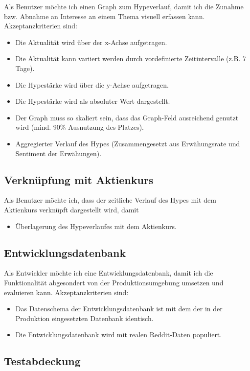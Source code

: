 \documentclass[a4paper, 10pt, conference]{ieeeconf}
\begin{document}
Als Benutzer möchte ich einen Graph zum Hypeverlauf, damit ich die Zunahme bzw. Abnahme an Interesse an einem Thema visuell erfassen kann. Akzeptanzkriterien sind:
\begin{itemize}
\item Die Aktualität wird über der x-Achse aufgetragen.
\item Die Aktualität kann variiert werden durch vordefinierte Zeitintervalle (z.B. 7 Tage).
\item Die Hypestärke wird über die y-Achse aufgetragen.
\item Die Hypestärke wird als absoluter Wert dargestellt.
\item Der Graph muss so skaliert sein, dass das Graph-Feld ausreichend genutzt wird (mind. 90\% Ausnutzung des Platzes).
\item Aggregierter Verlauf des Hypes (Zusammengesetzt aus Erwähungsrate und Sentiment der Erwähungen).
\end{itemize}

\subsection{Verknüpfung mit Aktienkurs}

Als Benutzer möchte ich, dass der zeitliche Verlauf des Hypes mit dem Aktienkurs verknüpft dargestellt wird, damit
\begin{itemize}
\item Überlagerung des Hypeverlaufes mit dem Aktienkurs.
\end{itemize}

\subsection{Entwicklungsdatenbank}

Als Entwickler möchte ich eine Entwicklungsdatenbank, damit ich die Funktionalität abgesondert von der Produktionsumgebung umsetzen und evaluieren kann. Akzeptanzkriterien sind:
\begin{itemize}
\item Das Datenschema der Entwicklungsdatenbank ist mit dem der in der Produktion eingesetzten Datenbank identisch.
\item Die Entwicklungsdatenbank wird mit realen Reddit-Daten populiert.
\end{itemize}

\subsection{Testabdeckung}
\end{document}
